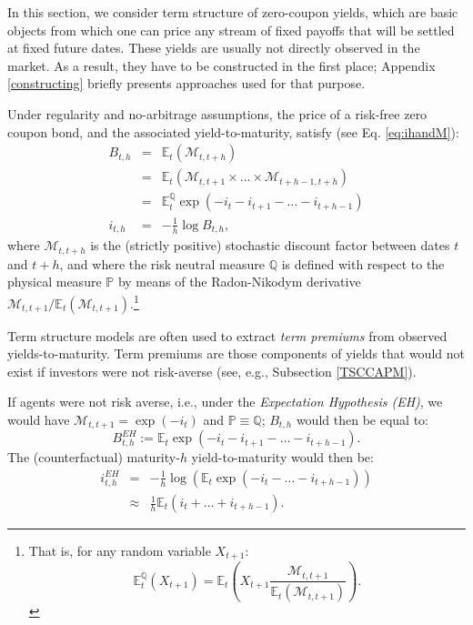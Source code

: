 \documentclass[
  12pt,
]{book}
\theoremstyle{definition}
\theoremstyle{definition}
\theoremstyle{definition}
\theoremstyle{definition}
\theoremstyle{remark}
\begin{document}
In this section, we consider term structure of zero-coupon yields, which are basic objects from which one can price any stream of fixed payoffs that will be settled at fixed future dates. These yields are usually not directly observed in the market. As a result, they have to be constructed in the first place; Appendix \ref{constructing} briefly presents approaches used for that purpose.

Under regularity and no-arbitrage assumptions, the price of a risk-free zero coupon bond, and the associated yield-to-maturity, satisfy (see Eq. \eqref{eq:ihandM}):
\begin{eqnarray}
B_{t,h} &=& \mathbb{E}_t (\mathcal{M}_{t,t+h})\nonumber\\
 &=& \mathbb{E}_t (\mathcal{M}_{t,t+1} \times \dots \times \mathcal{M}_{t+h-1,t+h})\nonumber\\
&=& \mathbb{E}^{\mathbb{Q}}_t \exp(-i_t -i_{t+1}-\dots-i_{t+h-1})\nonumber\\
i_{t,h} &=& - \frac{1}{h} \log B_{t,h}, \label{eq:stdbondRFchapter}
\end{eqnarray}
where \(\mathcal{M}_{t,t+h}\) is the (strictly positive) stochastic discount factor between dates \(t\) and \(t+h\), and where the risk neutral measure \(\mathbb{Q}\) is defined with respect to the physical measure \(\mathbb{P}\) by means of the Radon-Nikodym derivative \(\mathcal{M}_{t,t+1}\big/\mathbb{E}_t(\mathcal{M}_{t,t+1})\).\footnote{That is, for any random variable \(X_{t+1}\):
  \[
  \mathbb{E}^{\mathbb{Q}}_t(X_{t+1})=\mathbb{E}_t\left(X_{t+1}\frac{\mathcal{M}_{t,t+1}}{\mathbb{E}_t(\mathcal{M}_{t,t+1})}\right).
  \]}

Term structure models are often used to extract \emph{term premiums} from observed yields-to-maturity. Term premiums are those components of yields that would not exist if investors were not risk-averse (see, e.g., Subsection \ref{TSCCAPM}).

If agents were not risk averse, i.e., under the \emph{Expectation Hypothesis (EH)}, we would have \(\mathcal{M}_{t,t+1} = \exp(- i_t)\) and \(\mathbb{P} \equiv \mathbb{Q}\); \(B_{t,h}\) would then be equal to:
\begin{equation}
B^{EH}_{t,h} := \mathbb{E}_t \exp(-i_{t}-i_{t+1}-\dots-i_{t+h-1}).\label{eq:stdbondRFchapterP}
\end{equation}
The (counterfactual) maturity-\(h\) yield-to-maturity would then be:
\begin{eqnarray}
i^{EH}_{t,h} &=& -\frac{1}{h}\log \left( \mathbb{E}_t \exp(-i_t-\dots-i_{t+h-1})\right)\nonumber\\
&\approx& \frac{1}{h}\mathbb{E}_t(i_t + \dots + i_{t+h-1}).\label{eq:REH}
\end{eqnarray}
\end{document}
